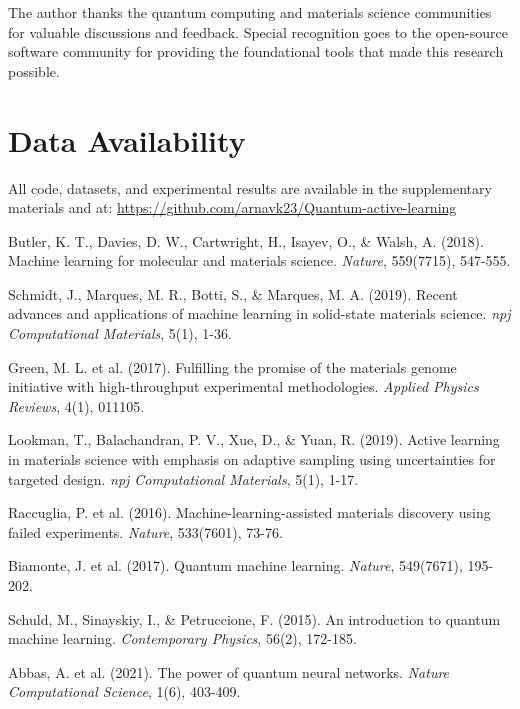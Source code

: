 \documentclass[twocolumn]{article}
\begin{document}
The author thanks the quantum computing and materials science communities for valuable discussions and feedback. Special recognition goes to the open-source software community for providing the foundational tools that made this research possible.

\section*{Data Availability}

All code, datasets, and experimental results are available in the supplementary materials and at: \url{https://github.com/arnavk23/Quantum-active-learning}


\begin{thebibliography}{20}

Butler, K. T., Davies, D. W., Cartwright, H., Isayev, O., \& Walsh, A. (2018). Machine learning for molecular and materials science. \textit{Nature}, 559(7715), 547-555.

Schmidt, J., Marques, M. R., Botti, S., \& Marques, M. A. (2019). Recent advances and applications of machine learning in solid-state materials science. \textit{npj Computational Materials}, 5(1), 1-36.

Green, M. L. et al. (2017). Fulfilling the promise of the materials genome initiative with high-throughput experimental methodologies. \textit{Applied Physics Reviews}, 4(1), 011105.

Lookman, T., Balachandran, P. V., Xue, D., \& Yuan, R. (2019). Active learning in materials science with emphasis on adaptive sampling using uncertainties for targeted design. \textit{npj Computational Materials}, 5(1), 1-17.

Raccuglia, P. et al. (2016). Machine-learning-assisted materials discovery using failed experiments. \textit{Nature}, 533(7601), 73-76.

Biamonte, J. et al. (2017). Quantum machine learning. \textit{Nature}, 549(7671), 195-202.

Schuld, M., Sinayskiy, I., \& Petruccione, F. (2015). An introduction to quantum machine learning. \textit{Contemporary Physics}, 56(2), 172-185.

Abbas, A. et al. (2021). The power of quantum neural networks. \textit{Nature Computational Science}, 1(6), 403-409.


\end{thebibliography}
\end{document}
